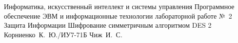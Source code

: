 \documentclass{bmstu}
\begin{document}
\makereporttitle
    {Информатика, искусственный интеллект и системы управления} %
    {Программное обеспечение ЭВМ и информационные технологии} %
    {лабораторной работе №~2} %
    {Защита Информации} %
    {Шифрование симметричным алгоритмом DES} %
    {2} %
    {Корниенко~К.~Ю./ИУ7-71Б} %
    {Чиж~И.~С.} %

\maketableofcontents






\makebibliography
\end{document}
